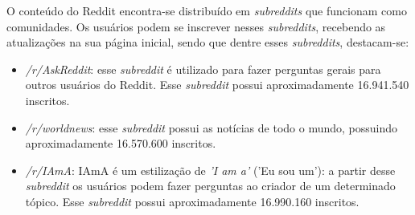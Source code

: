 O conteúdo do Reddit encontra-se distribuído em \textit{subreddits} que
funcionam como comunidades. Os usuários podem se inscrever nesses
\textit{subreddits}, recebendo as atualizações na sua página inicial, sendo
que dentre esses \textit{subreddits}, destacam-se:


\begin{itemize}
  \item \textit{/r/AskReddit}: esse \textit{subreddit} é utilizado para fazer
  perguntas gerais para outros usuários do Reddit. Esse \textit{subreddit}
  possui aproximadamente 16.941.540 inscritos.
  \item \textit{/r/worldnews}: esse \textit{subreddit} possui as notícias de
  todo o mundo, possuindo aproximadamente 16.570.600 inscritos.
  \item \textit{/r/IAmA}: IAmA é um estilização de \textit{'I am a'} ('Eu sou
  um'):
  a partir desse \textit{subreddit} os usuários podem fazer perguntas ao criador
  de um determinado tópico. Esse \textit{subreddit} possui aproximadamente
  16.990.160 inscritos.
\end{itemize}

% 


